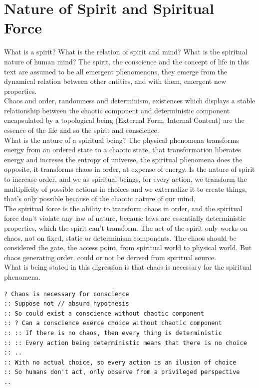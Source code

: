 \documentclass[12pt,a4paper]{article}
\begin{document}
\section{Nature of Spirit and Spiritual Force}

\hspace{\baselineskip}

What is a spirit? What is the relation of spirit and mind? What is the spiritual nature of human mind? The spirit, the conscience and the concept of life in this text are assumed to be all emergent phenomenons, they emerge from the dynamical relation between other entities, and with them, emergent new properties.\\

Chaos and order, randomness and determinism, existences which displays a stable relationship between the chaotic component and deterministic component encapsulated by a topological being (External Form, Internal Content) are the essence of the life and so the spirit and conscience.\\

What is the nature of a spiritual being? The physical phenomena transforms energy from an ordered state to a chaotic state, that transformation liberates energy and increses the entropy of universe, the spiritual phenomena does the opposite, it transforms chaos in order, at expense of energy. Is the nature of spirit to increase order, and we as spiritual beings, for every action, we transform the multiplicity of possible actions in choices and we externalize it to create things, that's only possible because of the chaotic nature of our mind.\\

The spiritual force is the ability to transform chaos in order, and the spiritual force don't violate any law of nature, because laws are essentially deterministic properties, which the spirit can't transform. The act of the spirit only works on chaos, not on fixed, static or determinism components. The chaos should be considered the gate, the access point, from spiritual world to physical world. But chaos generating order, could or not be derived from spiritual source.\\

What is being stated in this digression is that chaos is necessary for the spiritual phenomena.\\

\begin{lstlisting}
? Chaos is necessary for conscience 
:: Suppose not // absurd hypothesis 
:: So could exist a conscience without chaotic component 
:: ? Can a conscience exerce choice without chaotic component
:: :: If there is no chaos, then every thing is deterministic
:: :: Every action being deterministic means that there is no choice 
:: ..
:: With no actual choice, so every action is an ilusion of choice 
:: So humans don't act, only observe from a privileged perspective
.. 
\end{lstlisting}
\end{document}
